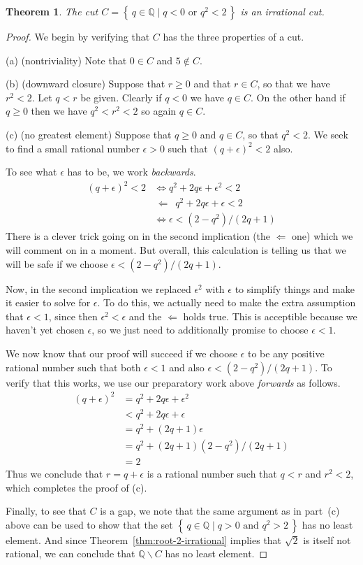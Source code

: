 \documentclass[11pt,oneside]{amsbook}
\newcommand{\set}[1]{\left\{\,#1\,\right\}}
\newcommand{\Q}{\mathbb Q}
\renewcommand{\setminus}{\smallsetminus}
\theoremstyle{definition}
\theoremstyle{plain}
\newtheorem{thm}{Theorem}[section]
\theoremstyle{definition}
\theoremstyle{remark}
\numberwithin{equation}{section}
\numberwithin{figure}{section}
\begin{document}
\begin{thm}
  \label{thm:root-2-cut}
  The cut $C=\set{q\in\Q\mid q<0\text{ or }q^2<2}$ is an irrational cut.
\end{thm}

\begin{proof}
  We begin by verifying that $C$ has the three properties of a cut.

  (a) (nontriviality) Note that $0\in C$ and $5\notin C$.

  (b) (downward closure) Suppose that $r\geq0$ and that $r\in C$, so that we have $r^2<2$. Let $q<r$ be given. Clearly if $q<0$ we have $q\in C$. On the other hand if $q\geq0$ then we have $q^2<r^2<2$ so again $q\in C$.

  (c) (no greatest element) Suppose that $q\geq0$ and $q\in C$, so that $q^2<2$. We seek to find a small rational number $\epsilon>0$ such that $(q+\epsilon)^2<2$ also.

  To see what $\epsilon$ has to be, we work \emph{backwards}.
  \begin{align*}
    (q+\epsilon)^2<2&\iff q^2+2q\epsilon+\epsilon^2<2\\
    &\,\Longleftarrow\,\,\, q^2+2q\epsilon+\epsilon<2\\
    &\iff \epsilon<(2-q^2)/(2q+1)
  \end{align*}
  There is a clever trick going on in the second implication (the $\Longleftarrow$ one) which we will comment on in a moment. But overall, this calculation is telling us that we will be safe if we choose $\epsilon<(2-q^2)/(2q+1)$.

  Now, in the second implication we replaced $\epsilon^2$ with $\epsilon$ to simplify things and make it easier to solve for $\epsilon$. To do this, we actually need to make the extra assumption that $\epsilon<1$, since then $\epsilon^2<\epsilon$ and the $\Longleftarrow$ holds true. This is acceptible because we haven't yet chosen $\epsilon$, so we just need to additionally promise to choose $\epsilon<1$.

  We now know that our proof will succeed if we choose $\epsilon$ to be any positive rational number such that both $\epsilon<1$ and also $\epsilon<(2-q^2)/(2q+1)$. To verify that this works, we use our preparatory work above \emph{forwards} as follows.
  \begin{align*}
    (q+\epsilon)^2&=q^2+2q\epsilon+\epsilon^2\\
    &<q^2+2q\epsilon+\epsilon\\
    &=q^2+(2q+1)\epsilon\\
    &=q^2+(2q+1)(2-q^2)/(2q+1)\\
    &=2
  \end{align*}
  Thus we conclude that $r=q+\epsilon$ is a rational number such that $q<r$ and $r^2<2$, which completes the proof of (c).

  Finally, to see that $C$ is a gap, we note that the same argument as in part~(c) above can be used to show that the set $\set{q\in\Q\mid q>0\text{ and }q^2>2}$ has no least element. And since Theorem~\ref{thm:root-2-irrational} implies that $\sqrt2$ is itself not rational, we can conclude that $\Q\setminus C$ has no least element.
\end{proof}
\end{document}
